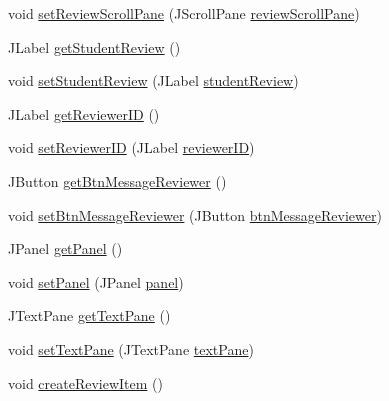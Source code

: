 \begin{DoxyCompactItemize}
void \mbox{\hyperlink{classcom_1_1_b_n_u_1_1pages_1_1teacher__review_1_1_review_model_a434e8b5d30d5c02b50b0a3b706302f6d}{set\+Review\+Scroll\+Pane}} (J\+Scroll\+Pane \mbox{\hyperlink{classcom_1_1_b_n_u_1_1pages_1_1teacher__review_1_1_review_model_a8573efe161b80c8adc42bd165f2b32b4}{review\+Scroll\+Pane}})
\item 
J\+Label \mbox{\hyperlink{classcom_1_1_b_n_u_1_1pages_1_1teacher__review_1_1_review_model_a185d9ab97b049ea2611057aeecc5b09a}{get\+Student\+Review}} ()
\item 
void \mbox{\hyperlink{classcom_1_1_b_n_u_1_1pages_1_1teacher__review_1_1_review_model_af7bd5bf783b6eb4415bb3bbd916a02d4}{set\+Student\+Review}} (J\+Label \mbox{\hyperlink{classcom_1_1_b_n_u_1_1pages_1_1teacher__review_1_1_review_model_aaf294efaab72da36b5af55c55015128c}{student\+Review}})
\item 
J\+Label \mbox{\hyperlink{classcom_1_1_b_n_u_1_1pages_1_1teacher__review_1_1_review_model_af6a55979c91ce9f26e3df5d43fc5e312}{get\+Reviewer\+ID}} ()
\item 
void \mbox{\hyperlink{classcom_1_1_b_n_u_1_1pages_1_1teacher__review_1_1_review_model_a03154d5c6c3cef36f9918050f898b3ff}{set\+Reviewer\+ID}} (J\+Label \mbox{\hyperlink{classcom_1_1_b_n_u_1_1pages_1_1teacher__review_1_1_review_model_ac686e5846bf39f0715af55ac066575eb}{reviewer\+ID}})
\item 
J\+Button \mbox{\hyperlink{classcom_1_1_b_n_u_1_1pages_1_1teacher__review_1_1_review_model_a450f313ef25fcfccbfaa12e99564bca1}{get\+Btn\+Message\+Reviewer}} ()
\item 
void \mbox{\hyperlink{classcom_1_1_b_n_u_1_1pages_1_1teacher__review_1_1_review_model_aa887ba3f4a4572879dd73a927ee294c9}{set\+Btn\+Message\+Reviewer}} (J\+Button \mbox{\hyperlink{classcom_1_1_b_n_u_1_1pages_1_1teacher__review_1_1_review_model_a5724f6cfb3dae50626ab9e0204a35223}{btn\+Message\+Reviewer}})
\item 
J\+Panel \mbox{\hyperlink{classcom_1_1_b_n_u_1_1pages_1_1teacher__review_1_1_review_model_acccf40f2feb568bdd45313fbcb39921c}{get\+Panel}} ()
\item 
void \mbox{\hyperlink{classcom_1_1_b_n_u_1_1pages_1_1teacher__review_1_1_review_model_a6eaf50a8e7c629979b06f9d6696909b0}{set\+Panel}} (J\+Panel \mbox{\hyperlink{classcom_1_1_b_n_u_1_1pages_1_1teacher__review_1_1_review_model_aeed35cfb76817f49258ef3b5691924b5}{panel}})
\item 
J\+Text\+Pane \mbox{\hyperlink{classcom_1_1_b_n_u_1_1pages_1_1teacher__review_1_1_review_model_a03c4caf7d072e79f012a43ecb559c782}{get\+Text\+Pane}} ()
\item 
void \mbox{\hyperlink{classcom_1_1_b_n_u_1_1pages_1_1teacher__review_1_1_review_model_a8fb4b40c5b23b4c157d3be8a2e9c9ef5}{set\+Text\+Pane}} (J\+Text\+Pane \mbox{\hyperlink{classcom_1_1_b_n_u_1_1pages_1_1teacher__review_1_1_review_model_a4fc16baa5ddf9da68c6a6bc189d829d5}{text\+Pane}})
\item 
void \mbox{\hyperlink{classcom_1_1_b_n_u_1_1pages_1_1teacher__review_1_1_review_model_a0b600b8b4ede2d1337dcacce46ca4632}{create\+Review\+Item}} ()
\end{DoxyCompactItemize}
